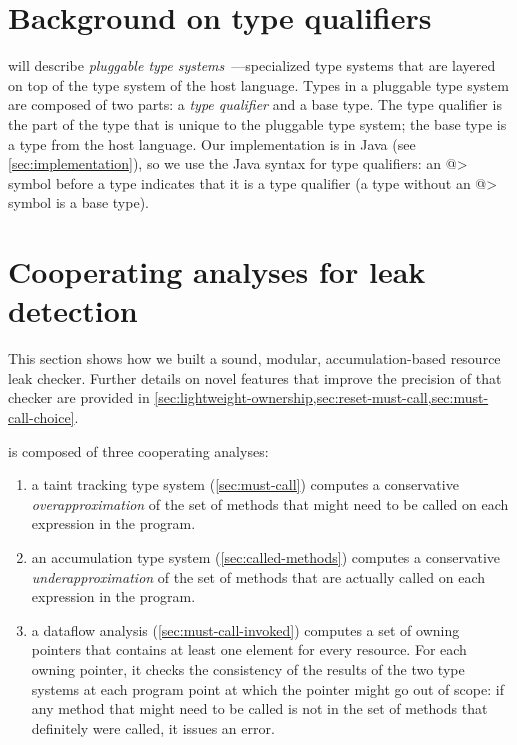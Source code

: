 \section{Background on type qualifiers}
\label{sec:background}

 will describe
\emph{pluggable type systems}~\cite{FosterFFA99}---specialized type
systems that are layered on top of the type system of the host
language.  Types in a pluggable type system are composed of two parts:
a \emph{type qualifier} and a base type. The type qualifier is the
part of the type that is unique to the pluggable type system; the base
type is a type from the host language. Our implementation is in Java
(see \cref{sec:implementation}), so we use the Java syntax for type
qualifiers: an \<@> symbol before a type indicates that it is a type
qualifier (a type without an \<@> symbol is a base type).


\section{Cooperating analyses for leak detection}
\label{sec:base-type-systems}

This section shows how we built a sound, modular, accumulation-based
resource leak checker.
Further details on novel features that improve the precision
of that checker are provided in
\cref{sec:lightweight-ownership,sec:reset-must-call,sec:must-call-choice}.

\Tool is composed of three cooperating analyses:
\begin{enumerate}
\item a taint tracking type system (\cref{sec:must-call}) computes a conservative
  \emph{overapproximation} of the set of methods that might need to be called
  on each expression in the program.
\item an accumulation type system (\cref{sec:called-methods}) computes
  a conservative \emph{underapproximation} of the set of methods that are
  actually called on each expression in the program.
\item a dataflow analysis (\cref{sec:must-call-invoked}) computes a set
  of owning pointers that contains at least one element for every resource.
  For each owning pointer, it checks the consistency of the results
  of the two type systems at each program
  point at which the pointer might go out of scope:
  if any method that might need to be called is not in the set of methods
  that definitely were called, it issues an error.
\end{enumerate}


